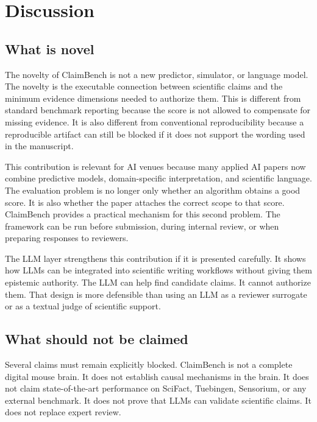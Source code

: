 \section{Discussion}
\label{sec:discussion}

\subsection{What is novel}
\label{subsec:novelty}

The novelty of ClaimBench is not a new predictor, simulator, or language model. The novelty is the executable connection between scientific claims and the minimum evidence dimensions needed to authorize them. This is different from standard benchmark reporting because the score is not allowed to compensate for missing evidence. It is also different from conventional reproducibility because a reproducible artifact can still be blocked if it does not support the wording used in the manuscript.

This contribution is relevant for AI venues because many applied AI papers now combine predictive models, domain-specific interpretation, and scientific language. The evaluation problem is no longer only whether an algorithm obtains a good score. It is also whether the paper attaches the correct scope to that score. ClaimBench provides a practical mechanism for this second problem. The framework can be run before submission, during internal review, or when preparing responses to reviewers.

The LLM layer strengthens this contribution if it is presented carefully. It shows how LLMs can be integrated into scientific writing workflows without giving them epistemic authority. The LLM can help find candidate claims. It cannot authorize them. That design is more defensible than using an LLM as a reviewer surrogate or as a textual judge of scientific support.

\subsection{What should not be claimed}
\label{subsec:forbidden-claims}

Several claims must remain explicitly blocked. ClaimBench is not a complete digital mouse brain. It does not establish causal mechanisms in the brain. It does not claim state-of-the-art performance on SciFact, Tuebingen, Sensorium, or any external benchmark. It does not prove that LLMs can validate scientific claims. It does not replace expert review.

